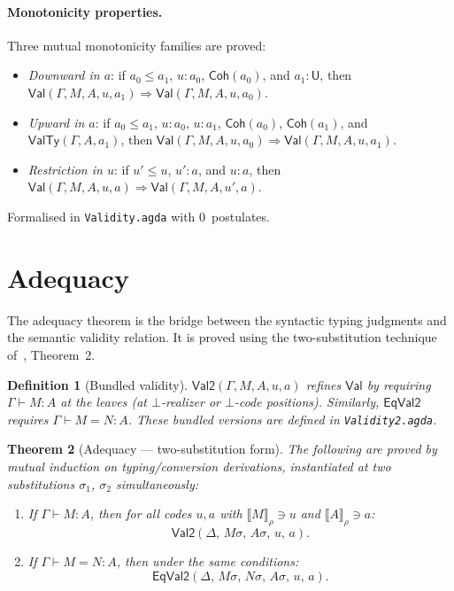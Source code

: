 \documentclass[11pt]{article}
\newcommand{\hastype}[3]{#1 \vdash #2 : #3}
\newcommand{\conveq}[4]{#1 \vdash #2 = #3 : #4}
\newcommand{\Bot}{\bot}
\newcommand{\UCode}{\mathsf{U}}
\newcommand{\LeCode}{\leq}
\newcommand{\Coh}{\mathsf{Coh}}
\newcommand{\FinMem}{\mathrel{:}}
\newcommand{\EvalRel}[3]{\llbracket #1 \rrbracket_{#2} \ni #3}
\newcommand{\ValR}{\mathsf{Val}}
\newtheorem{theorem}{Theorem}
\newtheorem{definition}[theorem]{Definition}
\begin{document}
\paragraph{Monotonicity properties.}
Three mutual monotonicity families are proved:
\begin{itemize}
  \item \emph{Downward in $a$}: if $a_0 \LeCode a_1$,
    $u \FinMem a_0$, $\Coh(a_0)$, and $a_1 \FinMem \UCode$, then
    $\ValR(\Gamma,M,A,u,a_1) \Rightarrow \ValR(\Gamma,M,A,u,a_0)$.
  \item \emph{Upward in $a$}: if $a_0 \LeCode a_1$,
    $u \FinMem a_0$, $u \FinMem a_1$, $\Coh(a_0)$, $\Coh(a_1)$,
    and $\mathsf{ValTy}(\Gamma, A, a_1)$, then
    $\ValR(\Gamma,M,A,u,a_0) \Rightarrow \ValR(\Gamma,M,A,u,a_1)$.
  \item \emph{Restriction in $u$}: if $u' \LeCode u$,
    $u' \FinMem a$, and $u \FinMem a$, then
    $\ValR(\Gamma,M,A,u,a) \Rightarrow \ValR(\Gamma,M,A,u',a)$.
\end{itemize}
Formalised in \texttt{Validity.agda} with 0~postulates.

\section{Adequacy}

The adequacy theorem is the bridge between the syntactic typing
judgments and the semantic validity relation.  It is proved using
the two-substitution technique of~\cite{CH2018}, Theorem~2.

\begin{definition}[Bundled validity]
  $\mathsf{Val2}(\Gamma, M, A, u, a)$ refines $\ValR$ by
  requiring $\hastype{\Gamma}{M}{A}$ at the leaves (at
  $\Bot$-realizer or $\Bot$-code positions).  Similarly,
  $\mathsf{EqVal2}$ requires $\conveq{\Gamma}{M}{N}{A}$.
  These bundled versions are defined in \texttt{Validity2.agda}.
\end{definition}

\begin{theorem}[Adequacy --- two-substitution form]
  \label{thm:adequacy}
  The following are proved by mutual induction on typing/conversion
  derivations, instantiated at two substitutions $\sigma_1$,
  $\sigma_2$ simultaneously:
  \begin{enumerate}
    \item If\/ $\hastype{\Gamma}{M}{A}$, then for all codes
      $u,a$ with $\EvalRel{M}{\rho}{u}$ and
      $\EvalRel{A}{\rho}{a}$:
      \[
        \mathsf{Val2}(\Delta,\, M\sigma,\, A\sigma,\, u,\, a).
      \]
    \item If\/ $\conveq{\Gamma}{M}{N}{A}$, then under the same
      conditions:
      \[
        \mathsf{EqVal2}(\Delta,\, M\sigma,\, N\sigma,\,
          A\sigma,\, u,\, a).
      \]
  \end{enumerate}
\end{theorem}
\end{document}
